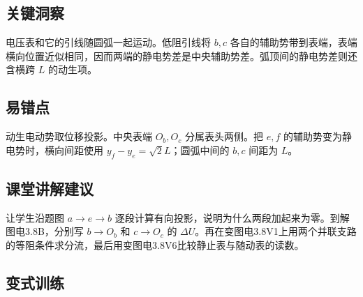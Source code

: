 \documentclass[UTF8,fontset=fandol,a4paper,11pt]{ctexart}
\begin{document}


\subsection*{关键洞察}

电压表和它的引线随圆弧一起运动。低阻引线将 $b,c$ 各自的辅助势带到表端，表端横向位置近似相同，因而两端的静电势差是中央辅助势差。弧顶间的静电势差则还含横跨 $L$ 的动生项。



\subsection*{易错点}

动生电动势取位移投影。中央表端 $O_b,O_c$ 分属表头两侧。把 $e,f$ 的辅助势变为静电势时，横向间距使用 $y_f-y_e=\sqrt2L$；圆弧中间的 $b,c$ 间距为 $L$。



\subsection*{课堂讲解建议}

让学生沿题图 $a\to e\to b$ 逐段计算有向投影，说明为什么两段加起来为零。到解图电3.8B，分别写 $b\to O_b$ 和 $c\to O_c$ 的 $\Delta U$。再在变图电3.8V1上用两个并联支路的等阻条件求分流，最后用变图电3.8V6比较静止表与随动表的读数。


\subsection*{变式训练}
\end{document}
